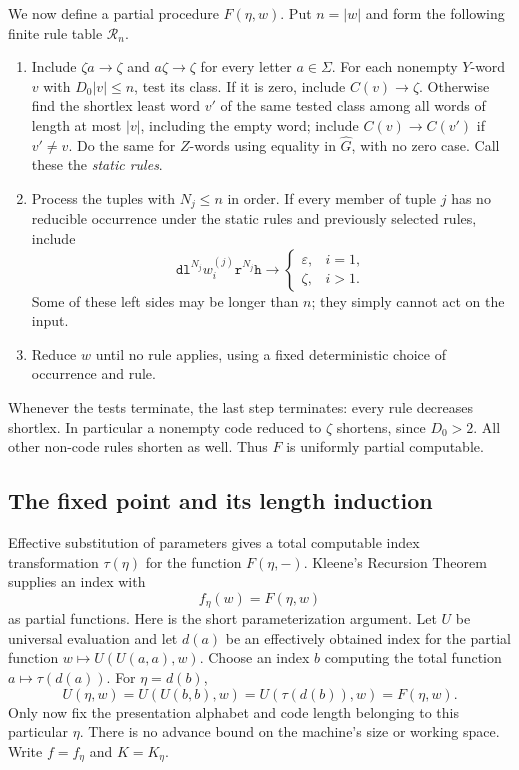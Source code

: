 We now define a partial procedure $F(\eta,w)$.  Put $n=|w|$ and form
the following finite rule table $\mathcal R_n$.
\begin{enumerate}
\item Include $\zeta a\to\zeta$ and $a\zeta\to\zeta$ for every
letter $a\in\Sigma$.  For each nonempty $Y$-word $v$ with
$D_0|v|\le n$, test its class.  If it is zero, include
$C(v)\to\zeta$.  Otherwise find the shortlex least word $v'$ of the
same tested class among all words of length at most $|v|$, including
the empty word; include $C(v)\to C(v')$ if $v'\ne v$.
Do the same for $Z$-words using equality in $\widehat G$, with no
zero case.  Call these the \emph{static rules}.

\item Process the tuples with $N_j\le n$ in order.  If every member
of tuple $j$ has no reducible occurrence under the static rules and
previously selected rules, include
\begin{equation}\label{eq:selector-rules}
 \mathtt d\mathtt l^{N_j}w_i^{(j)}\mathtt r^{N_j}\mathtt h
 \longrightarrow
 \begin{cases}
 \varepsilon,&i=1,\\
 \zeta,&i>1.
 \end{cases}
\end{equation}
Some of these left sides may be longer than $n$; they simply cannot
act on the input.

\item Reduce $w$ until no rule applies, using a fixed deterministic
choice of occurrence and rule.
\end{enumerate}
Whenever the tests terminate, the last step terminates: every rule
decreases shortlex.  In particular a nonempty code reduced to $\zeta$
shortens, since $D_0>2$.  All other non-code rules shorten as well.
Thus $F$ is uniformly partial computable.

\subsection{The fixed point and its length induction}

Effective substitution of parameters gives a total computable index
transformation $\tau(\eta)$ for the function $F(\eta,-)$.  Kleene's
Recursion Theorem~\cite{Kleene38} supplies an index with
\begin{equation}\label{eq:fixed-point}
 f_\eta(w)=F(\eta,w)
\end{equation}
as partial functions.  Here is the short parameterization argument.
Let $U$ be universal evaluation and let $d(a)$ be an effectively
obtained index for the partial function
$w\mapsto U(U(a,a),w)$.  Choose an index $b$ computing the total
function $a\mapsto\tau(d(a))$.  For $\eta=d(b)$,
\[
 U(\eta,w)=U(U(b,b),w)=U(\tau(d(b)),w)=F(\eta,w).
\]
Only now fix the presentation alphabet and code length belonging to
this particular $\eta$.  There is no advance bound on the machine's
size or working space.  Write $f=f_\eta$ and $K=K_\eta$.

